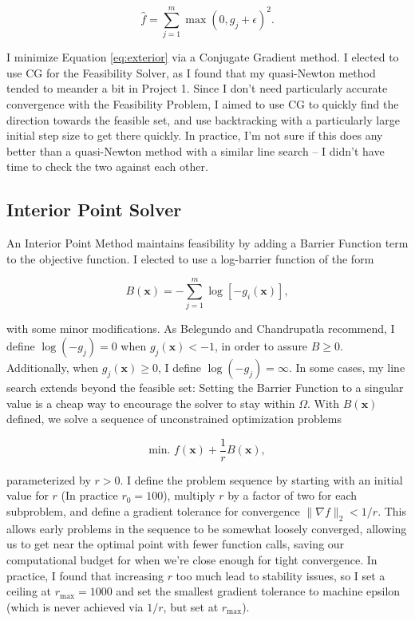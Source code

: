 \documentclass{article}
\newcommand{\bs}[1]{\boldsymbol{#1}}
\begin{document}
\begin{equation}
\hat{f} = \sum_{j=1}^m\max(0,g_j+\epsilon)^2. \label{eq:exterior} 
\end{equation}

I minimize Equation \ref{eq:exterior} via a Conjugate Gradient method. I elected to use CG for the Feasibility Solver, as I found that my quasi-Newton method tended to meander a bit in Project 1. Since I don't need particularly accurate convergence with the Feasibility Problem, I aimed to use CG to quickly find the direction towards the feasible set, and use backtracking with a particularly large initial step size to get there quickly. In practice, I'm not sure if this does any better than a quasi-Newton method with a similar line search -- I didn't have time to check the two against each other.

\subsection{Interior Point Solver}
An Interior Point Method maintains feasibility by adding a Barrier Function term to the objective function. I elected to use a log-barrier function of the form

\begin{equation}
B(\bs{x}) = -\sum_{j=1}^m\log[-g_i(\bs{x})], \label{eq:log_barrier}
\end{equation}

with some minor modifications. As Belegundo and Chandrupatla recommend, I define $\log(-g_j)=0$ when $g_j(\bs{x})<-1$, in order to assure $B\geq0$.\cite{mdo} Additionally, when $g_j(\bs{x})\geq0$, I define $\log(-g_j)=\infty$. In some cases, my line search extends beyond the feasible set: Setting the Barrier Function to a singular value is a cheap way to encourage the solver to stay within $\Omega$. With $B(\bs{x})$ defined, we solve a sequence of unconstrained optimization problems 

\begin{equation}
\text{min. }f(\bs{x}) + \frac{1}{r}B(\bs{x}), \label{eq:interior_objective}
\end{equation}

parameterized by $r>0$. I define the problem sequence by starting with an initial value for $r$ (In practice $r_0=100$), multiply $r$ by a factor of two for each subproblem, and define a gradient tolerance for convergence $\|\nabla f\|_2<1/r$. This allows early problems in the sequence to be somewhat loosely converged, allowing us to get near the optimal point with fewer function calls, saving our computational budget for when we're close enough for tight convergence. In practice, I found that increasing $r$ too much lead to stability issues, so I set a ceiling at $r_{\max}=1000$ and set the smallest gradient tolerance to machine epsilon (which is never achieved via $1/r$, but set at $r_{\max}$).
\end{document}
